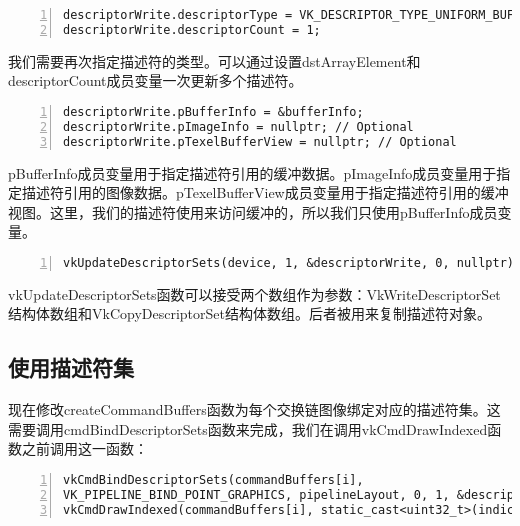 \documentclass{ctexart}
\begin{document}
\begin{lstlisting}[language={[ANSI]C},keywordstyle=\color{blue!70},commentstyle=\color{red!50!green!50!blue!50},frame=shadowbox, rulesepcolor=\color{red!20!green!20!blue!20},basicstyle=\small,numbers=left, numberstyle=\tiny,breaklines=true]
descriptorWrite.descriptorType = VK_DESCRIPTOR_TYPE_UNIFORM_BUFFER;
descriptorWrite.descriptorCount = 1;
\end{lstlisting}

我们需要再次指定描述符的类型。可以通过设置dstArrayElement和descriptorCount成员变量一次更新多个描述符。

\begin{lstlisting}[language={[ANSI]C},keywordstyle=\color{blue!70},commentstyle=\color{red!50!green!50!blue!50},frame=shadowbox, rulesepcolor=\color{red!20!green!20!blue!20},basicstyle=\small,numbers=left, numberstyle=\tiny,breaklines=true]
descriptorWrite.pBufferInfo = &bufferInfo;
descriptorWrite.pImageInfo = nullptr; // Optional
descriptorWrite.pTexelBufferView = nullptr; // Optional
\end{lstlisting}

pBufferInfo成员变量用于指定描述符引用的缓冲数据。pImageInfo成员变量用于指定描述符引用的图像数据。pTexelBufferView成员变量用于指定描述符引用的缓冲视图。这里，我们的描述符使用来访问缓冲的，所以我们只使用pBufferInfo成员变量。

\begin{lstlisting}[language={[ANSI]C},keywordstyle=\color{blue!70},commentstyle=\color{red!50!green!50!blue!50},frame=shadowbox, rulesepcolor=\color{red!20!green!20!blue!20},basicstyle=\small,numbers=left, numberstyle=\tiny,breaklines=true]
vkUpdateDescriptorSets(device, 1, &descriptorWrite, 0, nullptr);
\end{lstlisting}

vkUpdateDescriptorSets函数可以接受两个数组作为参数：VkWriteDescriptorSet结构体数组和VkCopyDescriptorSet结构体数组。后者被用来复制描述符对象。

\subsection{使用描述符集}

现在修改createCommandBuffers函数为每个交换链图像绑定对应的描述符集。这需要调用cmdBindDescriptorSets函数来完成，我们在调用vkCmdDrawIndexed函数之前调用这一函数：

\begin{lstlisting}[language={[ANSI]C},keywordstyle=\color{blue!70},commentstyle=\color{red!50!green!50!blue!50},frame=shadowbox, rulesepcolor=\color{red!20!green!20!blue!20},basicstyle=\small,numbers=left, numberstyle=\tiny,breaklines=true]
vkCmdBindDescriptorSets(commandBuffers[i],
VK_PIPELINE_BIND_POINT_GRAPHICS, pipelineLayout, 0, 1, &descriptorSets[i], 0, nullptr);
vkCmdDrawIndexed(commandBuffers[i], static_cast<uint32_t>(indices.size()), 1, 0, 0, 0);
\end{lstlisting}
\end{document}

